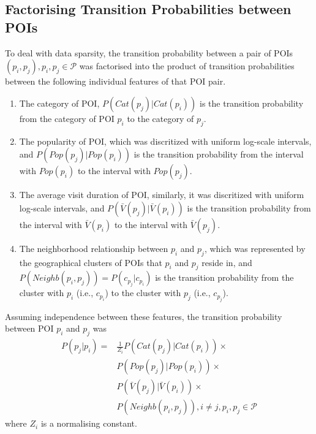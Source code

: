 \documentclass{sig-alternate-05-2015}
\begin{document}
\subsection{Factorising Transition Probabilities between POIs}
To deal with data sparsity,
the transition probability between a pair of POIs $(p_i, p_j), p_i, p_j \in \mathcal{P}$ was factorised into the product of
transition probabilities between the following individual features of that POI pair.
\begin{enumerate}
\item The category of POI, $P(Cat(p_j) | Cat(p_i))$
      is the transition probability from the category of POI $p_i$ to the category of $p_j$.
\item The popularity of POI, which was discritized with uniform log-scale intervals,
      and $P(Pop(p_j) | Pop(p_i))$ is the transition probability from the interval with $Pop(p_i)$ 
      to the interval with $Pop(p_j)$.
\item The average visit duration of POI, similarly, it was discritized with uniform log-scale intervals,
      and $P(\bar{V}(p_j) | \bar{V}(p_i))$ is the transition probability from the interval with $\bar{V}(p_i)$ 
      to the interval with $\bar{V}(p_j)$.
\item The neighborhood relationship between $p_i$ and $p_j$,
      which was represented by the geographical clusters of POIs that $p_i$ and $p_j$ reside in,
      and $P(Neighb(p_i, p_j)) = P(c_{p_j} | c_{p_i})$ is the transition probability from the cluster with 
      $p_i$ (i.e., $c_{p_i}$) to the cluster with $p_j$ (i.e., $c_{p_j}$).
\end{enumerate}

Assuming independence between these features,
the transition probability between POI $p_i$ and $p_j$ was
\begin{align*}
    P(p_j | p_i) = & \frac{1}{Z_i} P(Cat(p_j) | Cat(p_i)) \times \\ 
                   & P(Pop(p_j) | Pop(p_i)) \times \\
                   & P(\bar{V}(p_j) | \bar{V}(p_i)) \times \\
                   & P(Neighb(p_i, p_j)), i \ne j, p_i, p_j \in \mathcal{P}
\end{align*}
where $Z_i$ is a normalising constant.

\end{document}
